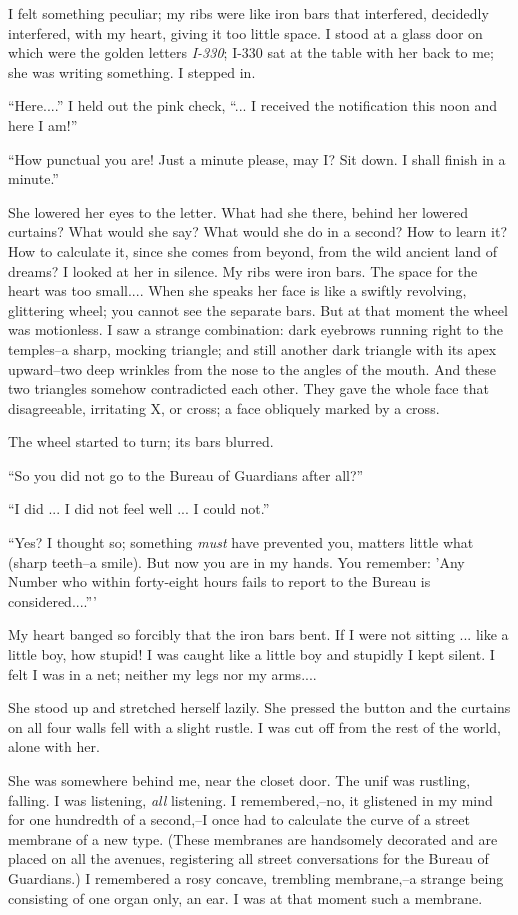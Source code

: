 \documentclass[11pt,openany]{book}
\begin{document}
I felt something peculiar; my ribs were like iron bars that interfered, decidedly interfered, with my heart, giving it too little space. I stood at a glass door on which were the golden letters \emph{I-330}; I-330 sat at the table with her back to me; she was writing something. I stepped in.

``Here....'' I held out the pink check, ``... I received the notification this noon and here I am!''

``How punctual you are! Just a minute please, may I? Sit down. I shall finish in a minute.''

She lowered her eyes to the letter. What had she there, behind her lowered curtains? What would she say? What would she do in a second? How to learn it? How to calculate it, since she comes from beyond, from the wild ancient land of dreams? I looked at her in silence. My ribs were iron bars. The space for the heart was too small.... When she speaks her face is like a swiftly revolving, glittering wheel; you cannot see the separate bars. But at that moment the wheel was motionless. I saw a strange combination: dark eyebrows running right to the temples--a sharp, mocking triangle; and still another dark triangle with its apex upward--two deep wrinkles from the nose to the angles of the mouth. And these two triangles somehow contradicted each other. They gave the whole face that disagreeable, irritating X, or cross; a face obliquely marked by a cross.

The wheel started to turn; its bars blurred.

``So you did not go to the Bureau of Guardians after all?''

``I did ... I did not feel well ... I could not.''

``Yes? I thought so; something \emph{must} have prevented you, matters little what (sharp teeth--a smile). But now you are in my hands. You remember: 'Any Number who within forty-eight hours fails to report to the Bureau is considered....'''

My heart banged so forcibly that the iron bars bent. If I were not sitting ... like a little boy, how stupid! I was caught like a little boy and stupidly I kept silent. I felt I was in a net; neither my legs nor my arms....

She stood up and stretched herself lazily. She pressed the button and the curtains on all four walls fell with a slight rustle. I was cut off from the rest of the world, alone with her.

She was somewhere behind me, near the closet door. The unif was rustling, falling. I was listening, \emph{all} listening. I remembered,--no, it glistened in my mind for one hundredth of a second,--I once had to calculate the curve of a street membrane of a new type. (These membranes are handsomely decorated and are placed on all the avenues, registering all street conversations for the Bureau of Guardians.) I remembered a rosy concave, trembling membrane,--a strange being consisting of one organ only, an ear. I was at that moment such a membrane.
\end{document}
